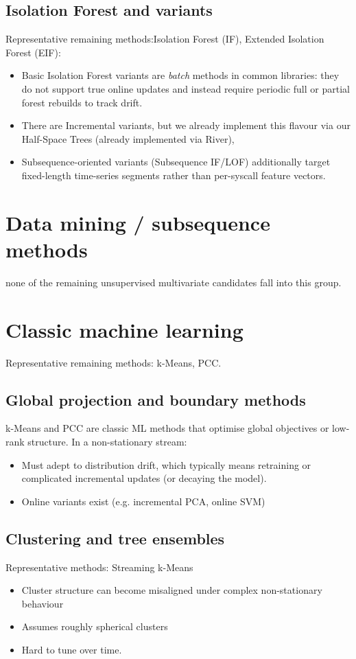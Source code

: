 \documentclass[a4paper,11pt]{article}
\begin{document}
\subsection*{Isolation Forest and variants}
Representative remaining methods:Isolation Forest (IF), Extended Isolation Forest (EIF):
\begin{itemize}
  \item Basic Isolation Forest variants are \emph{batch} methods in common libraries: they do not support true online updates and instead require periodic full or partial forest rebuilds to track drift.
  \item There are Incremental variants, but we already implement this flavour via our  Half-Space Trees (already implemented via River), 
  \item Subsequence-oriented variants (Subsequence IF/LOF) additionally target fixed-length time-series segments rather than per-syscall feature vectors.
\end{itemize}

\section{Data mining / subsequence methods}
none of the remaining unsupervised multivariate candidates fall into this group.

\section{Classic machine learning}
Representative remaining methods: k-Means, PCC.

\subsection*{Global projection and boundary methods}

k-Means and PCC are classic ML methods that optimise global objectives or low-rank structure. In a non-stationary stream:
\begin{itemize}
  \item Must adept to distribution drift, which typically means retraining or complicated incremental updates (or decaying the model).
  \item Online variants exist (e.g. incremental PCA, online SVM)
\end{itemize}

\subsection*{Clustering and tree ensembles}
Representative methods: Streaming k-Means
\begin{itemize}
  \item Cluster structure can become misaligned under complex non-stationary behaviour
  \item Assumes roughly spherical clusters
  \item Hard to tune over time.
\end{itemize}
\end{document}
